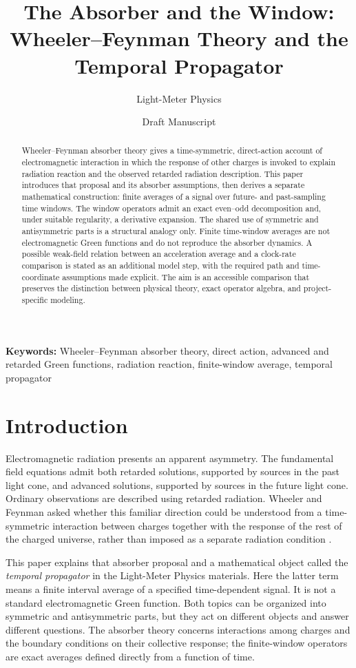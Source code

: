 \documentclass[12pt]{article}
\title{The Absorber and the Window:\\
Wheeler--Feynman Theory and the Temporal Propagator}
\author{Light-Meter Physics}
\date{Draft Manuscript}
\begin{document}
\maketitle

\begin{abstract}
Wheeler--Feynman absorber theory gives a time-symmetric, direct-action account of electromagnetic interaction in which the response of other charges is invoked to explain radiation reaction and the observed retarded radiation description. This paper introduces that proposal and its absorber assumptions, then derives a separate mathematical construction: finite averages of a signal over future- and past-sampling time windows. The window operators admit an exact even--odd decomposition and, under suitable regularity, a derivative expansion. The shared use of symmetric and antisymmetric parts is a structural analogy only. Finite time-window averages are not electromagnetic Green functions and do not reproduce the absorber dynamics. A possible weak-field relation between an acceleration average and a clock-rate comparison is stated as an additional model step, with the required path and time-coordinate assumptions made explicit. The aim is an accessible comparison that preserves the distinction between physical theory, exact operator algebra, and project-specific modeling.
\end{abstract}

\noindent\textbf{Keywords:} Wheeler--Feynman absorber theory, direct action, advanced and retarded Green functions, radiation reaction, finite-window average, temporal propagator

\section{Introduction}

Electromagnetic radiation presents an apparent asymmetry. The fundamental field equations admit both retarded solutions, supported by sources in the past light cone, and advanced solutions, supported by sources in the future light cone. Ordinary observations are described using retarded radiation. Wheeler and Feynman asked whether this familiar direction could be understood from a time-symmetric interaction between charges together with the response of the rest of the charged universe, rather than imposed as a separate radiation condition \cite{WheelerFeynman1945,WheelerFeynman1949}.

This paper explains that absorber proposal and a mathematical object called the \emph{temporal propagator} in the Light-Meter Physics materials. Here the latter term means a finite interval average of a specified time-dependent signal. It is not a standard electromagnetic Green function. Both topics can be organized into symmetric and antisymmetric parts, but they act on different objects and answer different questions. The absorber theory concerns interactions among charges and the boundary conditions on their collective response; the finite-window operators are exact averages defined directly from a function of time.
\end{document}
